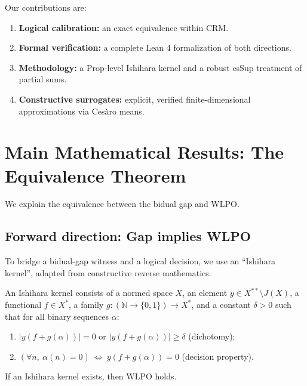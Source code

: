 \documentclass{lmcs}
\newcommand{\N}{\mathbb{N}}
\newcommand{\WLPO}{\mathrm{WLPO}}
\newcommand{\CRM}{\mathrm{CRM}}
\begin{document}
Our contributions are:
\begin{enumerate}[label=\arabic*.]
\item \textbf{Logical calibration:} an exact equivalence within $\CRM$.
\item \textbf{Formal verification:} a complete Lean 4 formalization of both directions.
\item \textbf{Methodology:} a Prop-level Ishihara kernel and a robust csSup treatment of partial sums.
\item \textbf{Constructive surrogates:} explicit, verified finite-dimensional approximations via Ces\`aro means.
\end{enumerate}

\section{Main Mathematical Results: The Equivalence Theorem}

We explain the equivalence between the bidual gap and $\WLPO$.

\subsection{Forward direction: Gap implies WLPO}

To bridge a bidual-gap witness and a logical decision, we use an ``Ishihara kernel'', adapted from constructive reverse mathematics.

\begin{defi}
An Ishihara kernel consists of a normed space $X$, an element $y\in X^{**}\setminus J(X)$, a functional $f\in X^*$, a family $g:(\N\to\{0,1\})\to X^*$, and a constant $\delta>0$ such that for all binary sequences $\alpha$:
\begin{enumerate}
\item $|y(f+g(\alpha))|=0$ or $|y(f+g(\alpha))|\ge \delta$ (dichotomy);
\item $(\forall n,\ \alpha(n)=0)\ \Leftrightarrow\ y(f+g(\alpha))=0$ (decision property).
\end{enumerate}
\end{defi}

\begin{lem}[Kernel $\Rightarrow$ $\WLPO$]
If an Ishihara kernel exists, then $\WLPO$ holds.
\end{lem}
\end{document}
